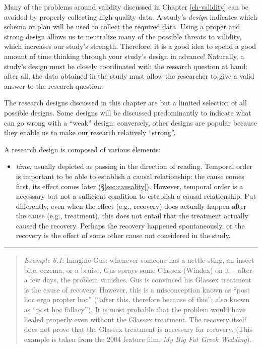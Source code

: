 \documentclass[
]{book}
\providecommand{\tightlist}{%
  \setlength{\itemsep}{0pt}\setlength{\parskip}{0pt}}
\begin{document}
Many of the problems around validity discussed in Chapter \ref{ch-validity} can be avoided by properly collecting high-quality data. A study's \emph{design} indicates which schema or plan will be used to collect the required data. Using a proper and strong design allows us to neutralize many of the possible threats to validity, which increases our study's strength. Therefore, it is a good idea to spend a good amount of time thinking through your study's design in advance! Naturally, a study's design must be closely coordinated with the research question at hand: after all, the data obtained in the study must allow the researcher to give a valid answer to the research question.

The research designs discussed in this chapter are but a limited selection of all possible designs. Some designs will be discussed predominantly to indicate what can go wrong with a ``weak'' design; conversely, other designs are popular because they enable us to make our research relatively ``strong''.

A research design is composed of various elements:

\begin{itemize}
\tightlist
\item
  \emph{time}, usually depicted as passing in the direction of reading. Temporal order is important to be able to establish a causal relationship: the cause comes first, its effect comes later (§\ref{sec:causality}). However, temporal order is a necessary but not a sufficient condition to establish a causal relationship. Put differently, even when the effect (e.g., recovery) does actually happen after the cause (e.g., treatment), this does not entail that the treatment actually caused the recovery. Perhaps the recovery happened spontaneously, or the recovery is the effect of some other cause not considered in the study.
\end{itemize}

\begin{center}\rule{0.5\linewidth}{0.5pt}\end{center}

\begin{quote}
\emph{Example 6.1}: Imagine Gus: whenever someone has a nettle sting, an insect bite, eczema, or a bruise, Gus sprays some Glassex (Windex) on it -- after a few days, the problem vanishes. Gus is convinced his Glassex treatment is the cause of recovery. However, this is a misconception known as ``post hoc ergo propter hoc'' (``after this, therefore because of this''; also known as ``post hoc fallacy''). It is most probable that the problem would have healed properly even without the Glassex treatment. The recovery itself does not prove that the Glassex treatment is necessary for recovery. (This example is taken from the 2004 feature film, \emph{My Big Fat Greek Wedding}).
\end{quote}
\end{document}

